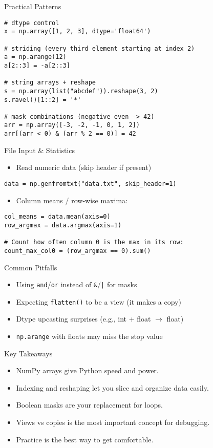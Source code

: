 \documentclass{beamer}
\begin{document}
\begin{frame}[fragile]{Practical Patterns}
\begin{verbatim}
# dtype control
x = np.array([1, 2, 3], dtype='float64')

# striding (every third element starting at index 2)
a = np.arange(12)
a[2::3] = -a[2::3]

# string arrays + reshape
s = np.array(list("abcdef")).reshape(3, 2)
s.ravel()[1::2] = '*'

# mask combinations (negative even -> 42)
arr = np.array([-3, -2, -1, 0, 1, 2])
arr[(arr < 0) & (arr % 2 == 0)] = 42
\end{verbatim}
\end{frame}

\begin{frame}[fragile]{File Input \& Statistics}
\begin{itemize}
  \item Read numeric data (skip header if present)
\end{itemize}
\begin{verbatim}
data = np.genfromtxt("data.txt", skip_header=1)
\end{verbatim}
\begin{itemize}
  \item Column means / row-wise maxima:
\end{itemize}
\begin{verbatim}
col_means = data.mean(axis=0)
row_argmax = data.argmax(axis=1)

# Count how often column 0 is the max in its row:
count_max_col0 = (row_argmax == 0).sum()
\end{verbatim}
\end{frame}

\begin{frame}{Common Pitfalls}
\begin{itemize}
  \item Using \texttt{and}/\texttt{or} instead of \texttt{\&}/\texttt{|} for masks
  \item Expecting \texttt{flatten()} to be a view (it makes a copy)
  \item Dtype upcasting surprises (e.g., int + float $\rightarrow$ float)
  \item \texttt{np.arange} with floats may miss the stop value
\end{itemize}
\end{frame}


\begin{frame}{Key Takeaways}
\begin{itemize}
  \item NumPy arrays give Python speed and power.
  \item Indexing and reshaping let you slice and organize data easily.
  \item Boolean masks are your replacement for loops.
  \item Views vs copies is the most important concept for debugging.
  \item Practice is the best way to get comfortable.
\end{itemize}
\end{frame}
\end{document}
